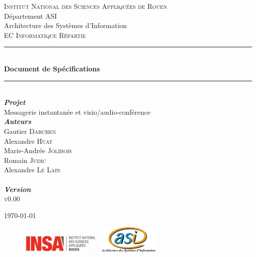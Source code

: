 \documentclass[11pt,dvipsnames,svgnames]{report}
\begin{document}
\begin{titlepage}
\newcommand{\HRule}{\rule{\linewidth}{0.5mm}} 
\center 
{}\textsc{\huge Institut National des Sciences Appliquées de Rouen}\\[0.7cm] 
\LARGE Département ASI~\\[0.5cm]
\Large{Architecture des Systèmes d'Information} ~\\[1.5cm]
\textsc{\Large EC Informatique Répartie}\\[0.5cm] 

\HRule \\[0.4cm]
{ \huge \bfseries Document de Spécifications}\\[0.18cm] \HRule \\[1.5cm]
 
\LARGE \emph{\textbf{Projet}} \\
{Messagerie instantanée et visio/audio-conférence}\\[1.3cm]

\large
	\emph{\textbf{Auteurs}}\\
	Gautier \textsc{Darchen} \\ 
	Alexandre \textsc{Huat} \\ 
	Marie-Andrée \textsc{Jolibois} \\ 
	Romain \textsc{Judic} \\ 
	Alexandre \textsc{Le Lain}\\[0.3cm]
	
~\\[0.5cm]
\Large \emph{\textbf{Version}}\\
	\textsc{v0.00}

\vfill{\today} 

\begin{figure}
\includegraphics[width=4cm]{images/LogoINSA.png}\hfill
\includegraphics[width=3cm]{images/logoasi.png}
\end{figure}


 \end{titlepage}
\end{document}
